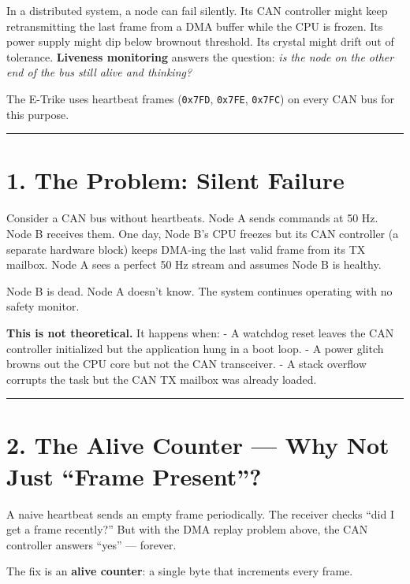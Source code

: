 \documentclass[12pt,a4paper,oneside]{report}
\begin{document}
In a distributed system, a node can fail silently. Its CAN controller might keep
retransmitting the last frame from a DMA buffer while the CPU is frozen. Its
power supply might dip below brownout threshold. Its crystal might drift out of
tolerance. \textbf{Liveness monitoring} answers the question: \emph{is the node
on the other end of the bus still alive and thinking?}

The E-Trike uses heartbeat frames (\texttt{0x7FD}, \texttt{0x7FE},
\texttt{0x7FC}) on every CAN bus for this purpose.

\begin{center}\rule{0.5\linewidth}{0.5pt}\end{center}

\section{1. The Problem: Silent Failure}\label{the-problem-silent-failure}

Consider a CAN bus without heartbeats. Node A sends commands at 50 Hz. Node B
receives them. One day, Node B's CPU freezes but its CAN controller (a separate
hardware block) keeps DMA-ing the last valid frame from its TX mailbox. Node A
sees a perfect 50 Hz stream and assumes Node B is healthy.

Node B is dead. Node A doesn't know. The system continues operating with no
safety monitor.

\textbf{This is not theoretical.} It happens when: - A watchdog reset leaves the
CAN controller initialized but the application hung in a boot loop. - A power
glitch browns out the CPU core but not the CAN transceiver. - A stack overflow
corrupts the task but the CAN TX mailbox was already loaded.

\begin{center}\rule{0.5\linewidth}{0.5pt}\end{center}

\section{2. The Alive Counter --- Why Not Just ``Frame
Present''?}\label{the-alive-counter-why-not-just-frame-present}

A naive heartbeat sends an empty frame periodically. The receiver checks ``did I
get a frame recently?'' But with the DMA replay problem above, the CAN
controller answers ``yes'' --- forever.

The fix is an \textbf{alive counter}: a single byte that increments every frame.
\end{document}
